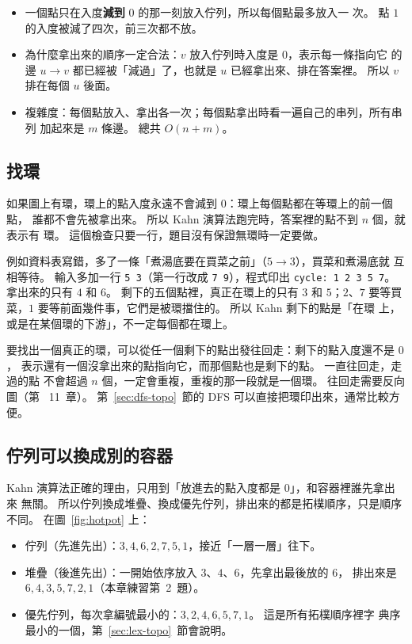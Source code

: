 \begin{itemize}
\item 一個點只在入度\textbf{減到} $0$ 的那一刻放入佇列，所以每個點最多放入一
次。 點 $1$ 的入度被減了四次，前三次都不放。
\item 為什麼拿出來的順序一定合法：$v$ 放入佇列時入度是 $0$，表示每一條指向它
的邊 $u \to v$ 都已經被「減過」了，也就是 $u$ 已經拿出來、排在答案裡。 所以
$v$ 排在每個 $u$ 後面。
\item 複雜度：每個點放入、拿出各一次；每個點拿出時看一遍自己的串列，所有串列
加起來是 $m$ 條邊。 總共 $O(n + m)$。
\end{itemize}

\subsection{找環}
\label{sec:kahn-cycle}

如果圖上有環，環上的點入度永遠不會減到 $0$：環上每個點都在等環上的前一個點，
誰都不會先被拿出來。 所以 Kahn 演算法跑完時，答案裡的點不到 $n$ 個，就表示有
環。 這個檢查只要一行，題目沒有保證無環時一定要做。

例如資料表寫錯，多了一條「煮湯底要在買菜之前」（$5 \to 3$），買菜和煮湯底就
互相等待。 輸入多加一行 \texttt{5 3}（第一行改成 \texttt{7 9}），程式印出
\texttt{cycle: 1 2 3 5 7}。 拿出來的只有 $4$ 和 $6$。 剩下的五個點裡，真正在環上的只有 $3$ 和 $5$；$2$、$7$
要等買菜，$1$ 要等前面幾件事，它們是被環擋住的。 所以 Kahn 剩下的點是「在環
上，或是在某個環的下游」，不一定每個都在環上。

要找出一個真正的環，可以從任一個剩下的點出發往回走：剩下的點入度還不是 $0$，
表示還有一個沒拿出來的點指向它，而那個點也是剩下的點。 一直往回走，走過的點
不會超過 $n$ 個，一定會重複，重複的那一段就是一個環。 往回走需要反向圖（第
~11~章）。 第~\ref{sec:dfs-topo}~節的 DFS 可以直接把環印出來，通常比較方便。

\subsection{佇列可以換成別的容器}

Kahn 演算法正確的理由，只用到「放進去的點入度都是 $0$」，和容器裡誰先拿出來
無關。 所以佇列換成堆疊、換成優先佇列，排出來的都是拓樸順序，只是順序不同。
在圖~\ref{fig:hotpot} 上：

\begin{itemize}
\item 佇列（先進先出）：$3, 4, 6, 2, 7, 5, 1$，接近「一層一層」往下。
\item 堆疊（後進先出）：一開始依序放入 $3$、$4$、$6$，先拿出最後放的 $6$，
排出來是 $6, 4, 3, 5, 7, 2, 1$（本章練習第~2~題）。
\item 優先佇列，每次拿編號最小的：$3, 2, 4, 6, 5, 7, 1$。 這是所有拓樸順序裡字
典序最小的一個，第~\ref{sec:lex-topo}~節會說明。
\end{itemize}

